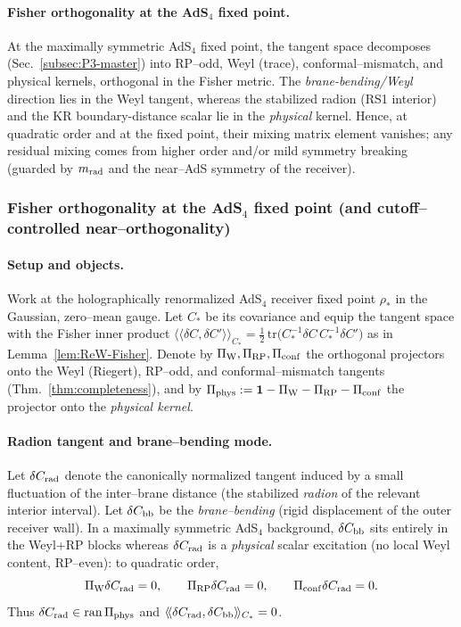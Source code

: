 \documentclass[10pt]{article}
\theoremstyle{definition}
\theoremstyle{plain}
\begin{document}
\paragraph{Fisher orthogonality at the AdS$_4$ fixed point.}\label{par:uom-main-117}
At the maximally symmetric AdS$_4$ fixed point, the tangent space decomposes (Sec.~\ref{subsec:P3-master})
into RP–odd, Weyl (trace), conformal–mismatch, and physical kernels, orthogonal in the Fisher metric.
The \emph{brane-bending/Weyl} direction lies in the Weyl tangent, whereas the stabilized radion (RS1 interior)
and the KR boundary-distance scalar lie in the \emph{physical} kernel. Hence, at quadratic order and at the
fixed point, their mixing matrix element vanishes; any residual mixing comes from higher order and/or mild
symmetry breaking (guarded by $m_{\rm rad}$ and the near--AdS symmetry of the receiver).

\subsubsection*{\texorpdfstring{Fisher orthogonality at the AdS$_4$ fixed point (and cutoff–controlled near–orthogonality)}{Fisher orthogonality at the AdS4 fixed point (and cutoff-controlled near-orthogonality)}}
\label{subsubsec:fisher-ortho}

\paragraph{Setup and objects.}\label{par:uom-main-118}
Work at the holographically renormalized AdS$_4$ receiver fixed point $\rho_\ast$ in the Gaussian,
zero–mean gauge. Let $C_\ast$ be its covariance and equip the tangent space with the Fisher inner
product
\(
\langle\!\langle \delta C,\delta C'\rangle\!\rangle_{C_\ast}
=\frac12\,\mathrm{tr}\!\big(C_\ast^{-1}\delta C\,C_\ast^{-1}\delta C'\big)
\)
as in Lemma~\ref{lem:ReW-Fisher}. Denote by
\(
\Pi_{\rm W},\Pi_{\rm RP},\Pi_{\rm conf}
\)
the orthogonal projectors onto the Weyl (Riegert), RP–odd, and conformal–mismatch tangents
(Thm.~\ref{thm:completeness}), and by
\(
\Pi_{\rm phys}:=\mathbf 1-\Pi_{\rm W}-\Pi_{\rm RP}-\Pi_{\rm conf}
\)
the projector onto the \emph{physical kernel}.

\paragraph{Radion tangent and brane–bending mode.}\label{par:uom-main-119}
Let $\delta C_{\rm rad}$ denote the canonically normalized tangent induced by a small fluctuation
of the inter–brane distance (the stabilized \emph{radion} of the relevant interior interval).
Let $\delta C_{\rm bb}$ be the \emph{brane–bending} (rigid displacement of the outer receiver
wall). In a maximally symmetric AdS$_4$ background, $\delta C_{\rm bb}$ sits entirely in the
Weyl+RP blocks whereas $\delta C_{\rm rad}$ is a \emph{physical} scalar excitation (no local
Weyl content, RP–even): to quadratic order,
\[
\Pi_{\rm W}\delta C_{\rm rad}=0,\qquad \Pi_{\rm RP}\delta C_{\rm rad}=0,\qquad
\Pi_{\rm conf}\delta C_{\rm rad}=0.
\]
Thus $\delta C_{\rm rad}\in \mathrm{ran}\,\Pi_{\rm phys}$ and
$\langle\!\langle \delta C_{\rm rad},\delta C_{\rm bb}\rangle\!\rangle_{C_\ast}=0$.
\end{document}
